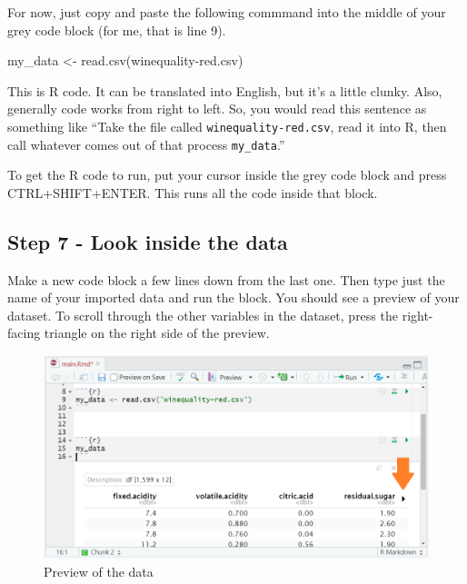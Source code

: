 \documentclass[
]{book}
\newenvironment{Shaded}{\begin{snugshade}}{\end{snugshade}}
\newcommand{\FunctionTok}[1]{\textcolor[rgb]{0.00,0.00,0.00}{#1}}
\newcommand{\NormalTok}[1]{#1}
\newcommand{\OtherTok}[1]{\textcolor[rgb]{0.56,0.35,0.01}{#1}}
\newcommand{\StringTok}[1]{\textcolor[rgb]{0.31,0.60,0.02}{#1}}
\begin{document}
For now, just copy and paste the following commmand into the middle of your grey code block (for me, that is line 9).

\begin{Shaded}
\begin{Highlighting}[]
\NormalTok{my\_data }\OtherTok{\textless{}{-}} \FunctionTok{read.csv}\NormalTok{(}\StringTok{\textquotesingle{}winequality{-}red.csv\textquotesingle{}}\NormalTok{)}
\end{Highlighting}
\end{Shaded}

This is R code. It can be translated into English, but it's a little clunky. Also, generally code works from right to left. So, you would read this sentence as something like ``Take the file called \texttt{winequality-red.csv}, read it into R, then call whatever comes out of that process \texttt{my\_data}.''

To get the R code to run, put your cursor inside the grey code block and press CTRL+SHIFT+ENTER. This runs all the code inside that block.

\hypertarget{step-7---look-inside-the-data}{%
\subsection{Step 7 - Look inside the data}\label{step-7---look-inside-the-data}}

Make a new code block a few lines down from the last one. Then type just the name of your imported data and run the block. You should see a preview of your dataset. To scroll through the other variables in the dataset, press the right-facing triangle on the right side of the preview.

\begin{figure}

{\centering \includegraphics[width=0.8\linewidth]{images/data_view} 

}

\caption{Preview of the data}\label{fig:unnamed-chunk-11}
\end{figure}
\end{document}
